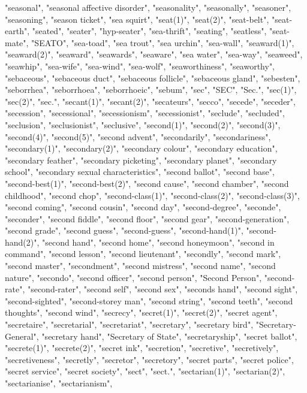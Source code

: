 "seasonal",
"seasonal affective disorder",
"seasonality",
"seasonally",
"seasoner",
"seasoning",
"season ticket",
"sea squirt",
"seat(1)",
"seat(2)",
"seat-belt",
"seat-earth",
"seated",
"seater",
"hyp-seater",
"sea-thrift",
"seating",
"seatless",
"seat-mate",
"SEATO",
"sea-toad",
"sea trout",
"sea urchin",
"sea-wall",
"seaward(1)",
"seaward(2)",
"seaward",
"seawards",
"seaware",
"sea water",
"sea-way",
"seaweed",
"seawhip",
"sea-wife",
"sea-wind",
"sea-wolf",
"seaworthiness",
"seaworthy",
"sebaceous",
"sebaceous duct",
"sebaceous follicle",
"sebaceous gland",
"sebesten",
"seborrhea",
"seborrhoea",
"seborrhoeic",
"sebum",
"sec",
"SEC",
"Sec.",
"sec(1)",
"sec(2)",
"sec.",
"secant(1)",
"secant(2)",
"secateurs",
"secco",
"secede",
"seceder",
"secession",
"secessional",
"secessionism",
"secessionist",
"seclude",
"secluded",
"seclusion",
"seclusionist",
"seclusive",
"second(1)",
"second(2)",
"second(3)",
"second(4)",
"second(5)",
"second advent",
"secondarily",
"secondariness",
"secondary(1)",
"secondary(2)",
"secondary colour",
"secondary education",
"secondary feather",
"secondary picketing",
"secondary planet",
"secondary school",
"secondary sexual characteristics",
"second ballot",
"second base",
"second-best(1)",
"second-best(2)",
"second cause",
"second chamber",
"second childhood",
"second chop",
"second-class(1)",
"second-class(2)",
"second-class(3)",
"second coming",
"second cousin",
"second day",
"second-degree",
"seconde",
"seconder",
"second fiddle",
"second floor",
"second gear",
"second-generation",
"second grade",
"second guess",
"second-guess",
"second-hand(1)",
"second-hand(2)",
"second hand",
"second home",
"second honeymoon",
"second in command",
"second lesson",
"second lieutenant",
"secondly",
"second mark",
"second master",
"secondment",
"second mistress",
"second name",
"second nature",
"secondo",
"second officer",
"second person",
"Second Person",
"second-rate",
"second-rater",
"second self",
"second sex",
"seconds hand",
"second sight",
"second-sighted",
"second-storey man",
"second string",
"second teeth",
"second thoughts",
"second wind",
"secrecy",
"secret(1)",
"secret(2)",
"secret agent",
"secretaire",
"secretarial",
"secretariat",
"secretary",
"secretary bird",
"Secretary-General",
"secretary hand",
"Secretary of State",
"secretaryship",
"secret ballot",
"secrete(1)",
"secrete(2)",
"secret ink",
"secretion",
"secretive",
"secretively",
"secretiveness",
"secretly",
"secretor",
"secretory",
"secret parts",
"secret police",
"secret service",
"secret society",
"sect",
"sect.",
"sectarian(1)",
"sectarian(2)",
"sectarianise",
"sectarianism",
